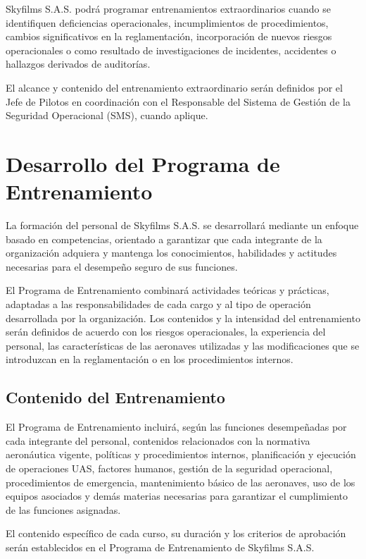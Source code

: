Skyfilms S.A.S. podrá programar entrenamientos extraordinarios cuando se identifiquen deficiencias operacionales, incumplimientos de procedimientos, cambios significativos en la reglamentación, incorporación de nuevos riesgos operacionales o como resultado de investigaciones de incidentes, accidentes o hallazgos derivados de auditorías.

El alcance y contenido del entrenamiento extraordinario serán definidos por el Jefe de Pilotos en coordinación con el Responsable del Sistema de Gestión de la Seguridad Operacional (SMS), cuando aplique.

\section{Desarrollo del Programa de Entrenamiento}


La formación del personal de Skyfilms S.A.S. se desarrollará mediante un enfoque basado en competencias, orientado a garantizar que cada integrante de la organización adquiera y mantenga los conocimientos, habilidades y actitudes necesarias para el desempeño seguro de sus funciones.

El Programa de Entrenamiento combinará actividades teóricas y prácticas, adaptadas a las responsabilidades de cada cargo y al tipo de operación desarrollada por la organización. Los contenidos y la intensidad del entrenamiento serán definidos de acuerdo con los riesgos operacionales, la experiencia del personal, las características de las aeronaves utilizadas y las modificaciones que se introduzcan en la reglamentación o en los procedimientos internos.

\subsection{Contenido del Entrenamiento}

El Programa de Entrenamiento incluirá, según las funciones desempeñadas por cada integrante del personal, contenidos relacionados con la normativa aeronáutica vigente, políticas y procedimientos internos, planificación y ejecución de operaciones UAS, factores humanos, gestión de la seguridad operacional, procedimientos de emergencia, mantenimiento básico de las aeronaves, uso de los equipos asociados y demás materias necesarias para garantizar el cumplimiento de las funciones asignadas.

El contenido específico de cada curso, su duración y los criterios de aprobación serán establecidos en el Programa de Entrenamiento de Skyfilms S.A.S.





